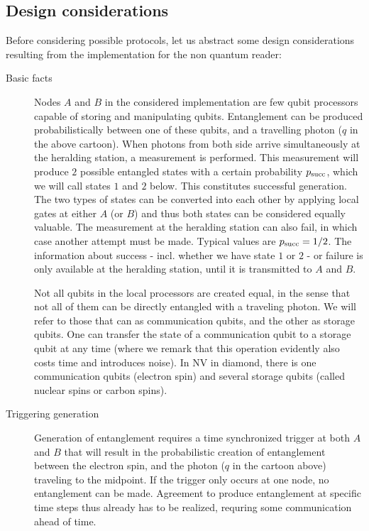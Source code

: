 \documentclass{article}
\begin{document}
\subsection{Design considerations}
Before considering possible protocols, let us abstract some design considerations resulting from the implementation for the non quantum reader:
\begin{description}
\item[Basic facts]
Nodes $A$ and $B$ in the considered implementation are few qubit processors capable of storing and manipulating qubits.
Entanglement can be produced probabilistically between one of these qubits, and a travelling photon ($q$ in the above cartoon).
When photons from both side arrive simultaneously at the heralding station, a measurement is performed. This measurement will produce $2$ possible
entangled states with a certain probability $p_{\rm succ}$, which we will call states $1$ and $2$ below. This constitutes successful generation.
The two types of states can be converted into each other by applying local gates at either $A$ (or $B$) and thus both states can be considered equally valuable. The
measurement at the heralding station can also fail, in which case another attempt must be made. Typical values are $p_{\rm succ} = 1/2$.
The information about success - incl. whether we have state $1$ or $2$ - or failure is only available at the heralding station, until it is transmitted
to $A$ and $B$.

Not all qubits in the local processors are created equal, in the sense that not all of them can be directly entangled with a traveling photon. We will refer to those that can
as communication qubits, and the other as storage qubits. One can transfer the state of a communication qubit to a storage qubit at any time (where we remark that this operation evidently also costs time and introduces noise). In NV in diamond,
there is one communication qubits (electron spin) and several storage qubits (called nuclear spins or carbon spins).

\item[Triggering generation]
Generation of entanglement requires a time synchronized trigger at both $A$ and $B$ that will result in the probabilistic
creation of entanglement between the electron spin, and the photon ($q$ in the cartoon above) traveling to the midpoint.
If the trigger only occurs at one node, no entanglement can be made. Agreement to produce entanglement at specific time steps thus already has to be realized, requring some communication ahead of time.


\end{description}
\end{document}
